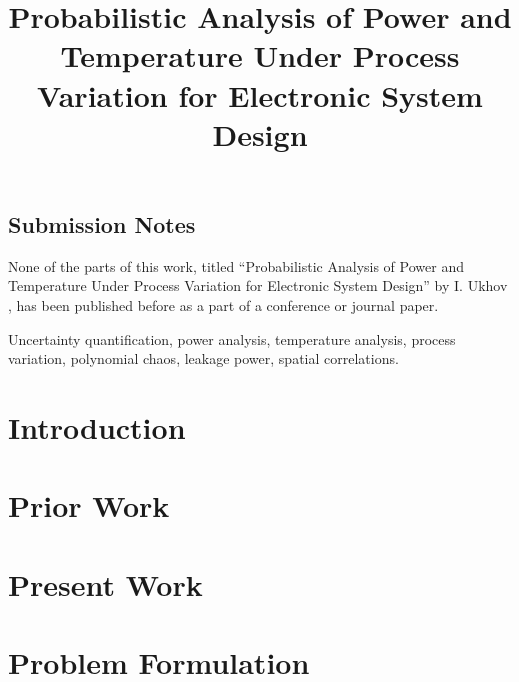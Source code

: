 \documentclass[journal]{IEEEtran}
\begin{document}
  \begin{titlepage}
    \section*{Submission Notes}
    None of the parts of this work, titled ``Probabilistic Analysis of Power and Temperature Under Process Variation for Electronic System Design'' by I. Ukhov \etal, has been published before as a part of a conference or journal paper.
  \end{titlepage}

  \title{\TitleFont Probabilistic Analysis of Power and Temperature Under Process Variation for Electronic System Design}

  \author{
    
  }

  \maketitle

  \begin{abstract}
    
  \end{abstract}

  \begin{IEEEkeywords}
    Uncertainty quantification, power analysis, temperature analysis, process variation, polynomial chaos, leakage power, spatial correlations.
  \end{IEEEkeywords}

  \section{Introduction} 
  

  \section{Prior Work} 
  

  \section{Present Work} 
  

  \section{Problem Formulation} 
  
\end{document}
